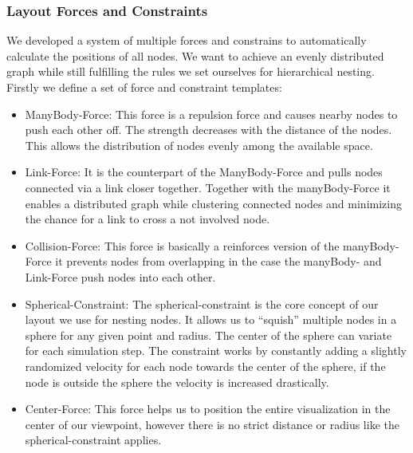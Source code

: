 \subsubsection{Layout Forces and Constraints}
We developed a system of multiple forces and constrains to automatically calculate the positions of all nodes. We want to achieve an evenly distributed graph while still fulfilling the rules we set ourselves for hierarchical nesting. Firstly we define a set of force and constraint templates:
\begin{itemize}
    \item ManyBody-Force: This force is a repulsion force and causes nearby nodes to push each other off. The strength decreases with the distance of the nodes. This allows the distribution of nodes evenly among the available space.
    \item Link-Force: It is the counterpart of the ManyBody-Force and pulls nodes connected via a link closer together. Together with the manyBody-Force it enables a distributed graph while clustering connected nodes and minimizing the chance for a link to cross a not involved node.
    \item Collision-Force: This force is basically a reinforces version of the manyBody-Force it prevents nodes from overlapping in the case the manyBody- and Link-Force push nodes into each other.
    \item Spherical-Constraint: The spherical-constraint is the core concept of our layout we use for nesting nodes. It allows us to “squish” multiple nodes in a sphere for any given point and radius. The center of the sphere can variate for each simulation step. The constraint works by constantly adding a slightly randomized velocity for each node towards the center of the sphere, if the node is outside the sphere the velocity is increased drastically.
    \item Center-Force: This force helps us to position the entire visualization in the center of our viewpoint, however there is no strict distance or radius like the spherical-constraint applies.
\end{itemize}

